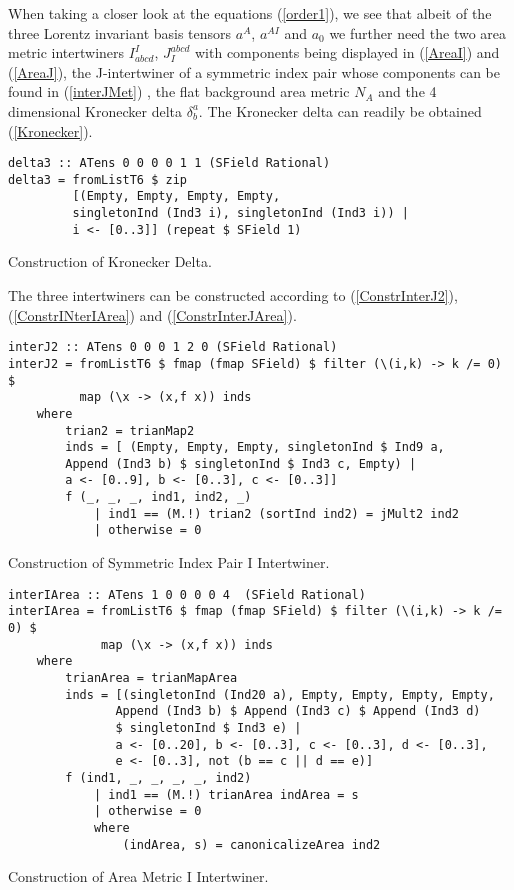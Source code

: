When taking a closer look at the equations (\ref{order1}), we see that albeit of the three Lorentz invariant basis tensors $a^{A}$, $a^{AI}$ and $a_0$ we further need the two area metric intertwiners $I^I_{abcd}$, $J_I^{abcd}$ with components being displayed in (\ref{AreaI}) and (\ref{AreaJ}), the J-intertwiner of a symmetric index pair whose components can be found in (\ref{interJMet})  , the flat background area metric $N_A$ and the 4 dimensional Kronecker delta $\delta^a_b$. 
The Kronecker delta can readily be obtained (\ref{Kronecker}).
\begin{listing}[hbt!]
\begin{verbatim}
delta3 :: ATens 0 0 0 0 1 1 (SField Rational)
delta3 = fromListT6 $ zip
         [(Empty, Empty, Empty, Empty,
         singletonInd (Ind3 i), singletonInd (Ind3 i)) | 
         i <- [0..3]] (repeat $ SField 1)
\end{verbatim} 
\caption{Construction of Kronecker Delta.}\label{Kronecker}
\end{listing}
The three intertwiners can be constructed according to (\ref{ConstrInterJ2}), (\ref{ConstrINterIArea}) and (\ref{ConstrInterJArea}).
\begin{listing}[hbt!]
\begin{verbatim}
interJ2 :: ATens 0 0 0 1 2 0 (SField Rational)
interJ2 = fromListT6 $ fmap (fmap SField) $ filter (\(i,k) -> k /= 0) $
          map (\x -> (x,f x)) inds
    where
        trian2 = trianMap2
        inds = [ (Empty, Empty, Empty, singletonInd $ Ind9 a,
        Append (Ind3 b) $ singletonInd $ Ind3 c, Empty) |
        a <- [0..9], b <- [0..3], c <- [0..3]]
        f (_, _, _, ind1, ind2, _)
            | ind1 == (M.!) trian2 (sortInd ind2) = jMult2 ind2
            | otherwise = 0
\end{verbatim} 
\caption{Construction of Symmetric Index Pair I Intertwiner.}\label{ConstrInterJ2}
\end{listing}
\begin{listing}[hbt!]
\begin{verbatim}
interIArea :: ATens 1 0 0 0 0 4  (SField Rational)
interIArea = fromListT6 $ fmap (fmap SField) $ filter (\(i,k) -> k /= 0) $
             map (\x -> (x,f x)) inds
    where
        trianArea = trianMapArea
        inds = [(singletonInd (Ind20 a), Empty, Empty, Empty, Empty,
               Append (Ind3 b) $ Append (Ind3 c) $ Append (Ind3 d) 
               $ singletonInd $ Ind3 e) |
               a <- [0..20], b <- [0..3], c <- [0..3], d <- [0..3],
               e <- [0..3], not (b == c || d == e)]
        f (ind1, _, _, _, _, ind2)
            | ind1 == (M.!) trianArea indArea = s
            | otherwise = 0
            where
                (indArea, s) = canonicalizeArea ind2
\end{verbatim} 
\caption{Construction of Area Metric I Intertwiner. }\label{ConstrINterIArea}
\end{listing}
